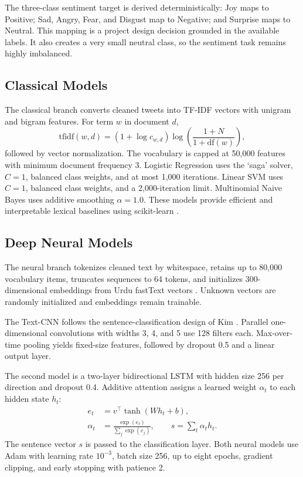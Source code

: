 \documentclass[conference]{IEEEtran}
\begin{document}
The three-class sentiment target is derived deterministically: Joy maps to Positive; Sad, Angry, Fear, and Disgust map to Negative; and Surprise maps to Neutral. This mapping is a project design decision grounded in the available labels. It also creates a very small neutral class, so the sentiment task remains highly imbalanced.

\subsection{Classical Models}
The classical branch converts cleaned tweets into TF-IDF vectors with unigram and bigram features. For term $w$ in document $d$,
\begin{equation}
\mathrm{tfidf}(w,d)=\left(1+\log c_{w,d}\right)
\log\left(\frac{1+N}{1+\mathrm{df}(w)}\right),
\end{equation}
followed by vector normalization. The vocabulary is capped at 50,000 features with minimum document frequency 3. Logistic Regression uses the `saga' solver, $C=1$, balanced class weights, and at most 1,000 iterations. Linear SVM uses $C=1$, balanced class weights, and a 2,000-iteration limit. Multinomial Naive Bayes uses additive smoothing $\alpha = 1.0$. These models provide efficient and interpretable lexical baselines using scikit-learn \cite{pedregosa2011sklearn}.

\subsection{Deep Neural Models}
The neural branch tokenizes cleaned text by whitespace, retains up to 80,000 vocabulary items, truncates sequences to 64 tokens, and initializes 300-dimensional embeddings from Urdu fastText vectors \cite{mikolov2018fasttext}. Unknown vectors are randomly initialized and embeddings remain trainable.

The Text-CNN follows the sentence-classification design of Kim \cite{kim2014cnn}. Parallel one-dimensional convolutions with widths 3, 4, and 5 use 128 filters each. Max-over-time pooling yields fixed-size features, followed by dropout 0.5 and a linear output layer.

The second model is a two-layer bidirectional LSTM \cite{hochreiter1997lstm} with hidden size 256 per direction and dropout 0.4. Additive attention \cite{bahdanau2015attention} assigns a learned weight $\alpha_t$ to each hidden state $h_t$:
\begin{align}
e_t&=v^\top\tanh(Wh_t+b),\\
\alpha_t&=\frac{\exp(e_t)}{\sum_j\exp(e_j)},\qquad
s=\sum_t\alpha_t h_t.
\end{align}
The sentence vector $s$ is passed to the classification layer. Both neural models use Adam with learning rate $10^{-3}$, batch size 256, up to eight epochs, gradient clipping, and early stopping with patience 2.
\end{document}
